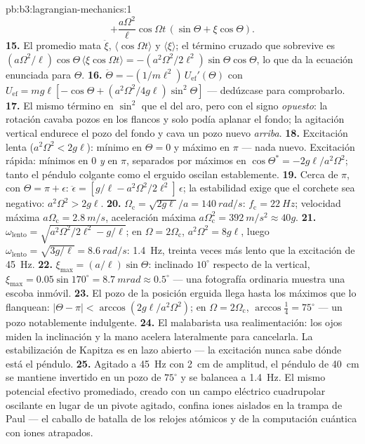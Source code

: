 \begin{solution}{pb:b3:lagrangian-mechanics:1}
\[ + \frac{a\Omega^2}{\ell}\cos\Omega t\,(\sin\Theta + \xi\cos\Theta) .
\]
\textbf{15.} El promedio mata $\ddot\xi$, $\langle\cos\Omega t\rangle$
y $\langle\xi\rangle$; el término cruzado que sobrevive es
$(a\Omega^2/\ell)\cos\Theta\,\langle\xi\cos\Omega t\rangle =
-(a^2\Omega^2/2\ell^2)\sin\Theta\cos\Theta$, lo que da la ecuación
enunciada para $\Theta$.
\textbf{16.} $\ddot\Theta = -(1/m\ell^2)\,U_{\text{ef}}'(\Theta)$ con
$U_{\text{ef}} = mg\ell[-\cos\Theta + (a^2\Omega^2/4g\ell)
\sin^2\Theta]$ --- dedúzcase para comprobarlo.
\textbf{17.} El mismo término en $\sin^2$ que el del aro, pero con el signo
\emph{opuesto}: la rotación cavaba pozos en los flancos y solo podía
aplanar el fondo; la agitación vertical endurece el pozo del fondo y cava
un pozo nuevo \emph{arriba}.
\textbf{18.} Excitación lenta ($a^2\Omega^2 < 2g\ell$): mínimo en $\Theta =
0$ y máximo en $\pi$ --- nada nuevo. Excitación rápida: mínimos en $0$
\emph{y} en $\pi$, separados por máximos en $\cos\Theta^* =
-2g\ell/a^2\Omega^2$; tanto el péndulo colgante como el erguido oscilan
establemente.
\textbf{19.} Cerca de $\pi$, con $\Theta = \pi + \epsilon$:
$\ddot\epsilon = [g/\ell - a^2\Omega^2/2\ell^2]\,\epsilon$; la estabilidad
exige que el corchete sea negativo: $a^2\Omega^2 > 2g\ell$.
\textbf{20.} $\Omega_{\text{c}} = \sqrt{2g\ell}/a = \qty{140}{rad/s}$:
$f_{\text{c}} = \qty{22}{Hz}$; velocidad máxima $a\Omega_{\text{c}} =
\qty{2.8}{m/s}$, aceleración máxima $a\Omega_{\text{c}}^2 =
\qty{392}{m/s^2} \approx 40g$.
\textbf{21.} $\omega_{\text{lento}} = \sqrt{a^2\Omega^2/2\ell^2 -
g/\ell}$; en $\Omega = 2\Omega_{\text{c}}$, $a^2\Omega^2 = 8g\ell$, luego
$\omega_{\text{lento}} = \sqrt{3g/\ell} = \qty{8.6}{rad/s}$:
\qty{1.4}{Hz}, treinta veces más lento que la excitación de \qty{45}{Hz}.
\textbf{22.} $\xi_{\max} = (a/\ell)\sin\Theta$: inclinado $10^\circ$
respecto de la vertical, $\xi_{\max} = 0.05\sin170^\circ = \qty{8.7}{mrad}
\approx 0.5^\circ$ --- una fotografía ordinaria muestra una escoba
inmóvil.
\textbf{23.} El pozo de la posición erguida llega hasta los máximos que lo
flanquean: $|\Theta - \pi| < \arccos(2g\ell/a^2\Omega^2)$; en $\Omega =
2\Omega_{\text{c}}$, $\arccos\tfrac14 = 75^\circ$ --- un pozo notablemente
indulgente.
\textbf{24.} El malabarista usa realimentación: los ojos miden la
inclinación y la mano acelera lateralmente para cancelarla. La
estabilización de Kapitza es en lazo abierto --- la excitación nunca sabe
dónde está el péndulo.
\textbf{25.} Agitado a \qty{45}{Hz} con \qty{2}{cm} de amplitud, el péndulo
de \qty{40}{cm} se mantiene invertido en un pozo de $75^\circ$ y se balancea
a \qty{1.4}{Hz}. El mismo potencial efectivo promediado, creado con un campo
eléctrico cuadrupolar oscilante en lugar de un pivote agitado, confina iones
aislados en la trampa de Paul --- el caballo de batalla de los relojes
atómicos y de la computación cuántica con iones atrapados.
\end{solution}
